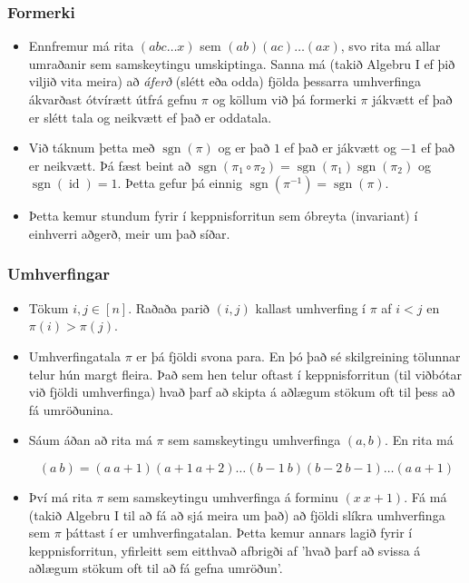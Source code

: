 \documentclass{beamer}
\begin{document}
\begin{frame}
\frametitle{Formerki}

\begin{itemize}

\item<1-> Ennfremur má rita $(a b c \dots x)$ sem $(a b)(a c)\dots(a x)$, svo rita má allar umraðanir sem samskeytingu umskiptinga. Sanna má (takið Algebru I ef þið viljið vita meira) að \textit{áferð} (slétt eða odda) fjölda þessarra umhverfinga ákvarðast ótvírætt útfrá gefnu $\pi$ og köllum við þá formerki $\pi$ jákvætt ef það er slétt tala og neikvætt ef það er oddatala.

\item<2-> Við táknum þetta með $\operatorname{sgn}(\pi)$ og er það $1$ ef það er jákvætt og $-1$ ef það er neikvætt. Þá fæst beint að $\operatorname{sgn}(\pi_1 \circ \pi_2) = \operatorname{sgn}(\pi_1)\operatorname{sgn}(\pi_2)$ og $\operatorname{sgn}(\operatorname{id}) = 1$. Þetta gefur þá einnig $\operatorname{sgn}(\pi^{-1}) = \operatorname{sgn}(\pi)$.

\item<3-> Þetta kemur stundum fyrir í keppnisforritun sem óbreyta (invariant) í einhverri aðgerð, meir um það síðar.

\end{itemize}

\end{frame}

\begin{frame}
\frametitle{Umhverfingar}

\begin{itemize}

\item<1-> Tökum $i,j \in [n]$. Raðaða parið $(i, j)$ kallast umhverfing í $\pi$ af $i < j$ en $\pi(i) > \pi(j)$.

\item<2-> Umhverfingatala $\pi$ er þá fjöldi svona para. En þó það sé skilgreining tölunnar telur hún margt fleira. Það sem hen telur oftast í keppnisforritun (til viðbótar við fjöldi umhverfinga) hvað þarf að skipta á aðlægum stökum oft til þess að fá umröðunina.

\item<3-> Sáum áðan að rita má $\pi$ sem samskeytingu umhverfinga $(a, b)$. En rita má 

\[(a \ b) = (a \ a + 1)(a + 1 \ a + 2)\dots(b - 1 \ b)(b - 2 \ b - 1)\dots(a \ a + 1)\]

\item<4-> Því má rita $\pi$ sem samskeytingu umhverfinga á forminu $(x \ x + 1)$. Fá má (takið Algebru I til að fá að sjá meira um það) að fjöldi slíkra umhverfinga sem $\pi$ þáttast í er umhverfingatalan. Þetta kemur annars lagið fyrir í keppnisforritun, yfirleitt sem eitthvað afbrigði af 'hvað þarf að svissa á aðlægum stökum oft til að fá gefna umröðun'.

\end{itemize}

\end{frame}
\end{document}
